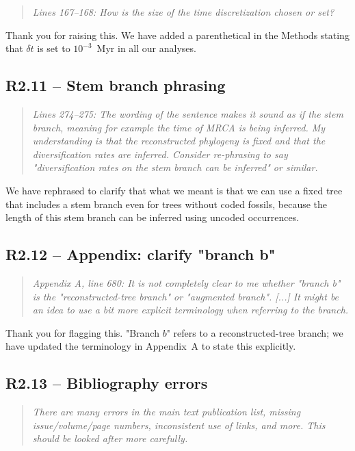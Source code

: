 \documentclass[11pt]{article}
\newenvironment{RC}{\begin{quote}\itshape}{\end{quote}}
\newcommand{\response}[1]{\noindent\textcolor{resp}{#1}\medskip}
\begin{document}
\begin{RC}
Lines 167--168: How is the size of the time discretization chosen or set?
\end{RC}

\response{Thank you for raising this. We have added a parenthetical in the Methods stating that $\delta t$ is set to $10^{-3}$~Myr in all our analyses.}

\subsection*{R2.11 -- Stem branch phrasing}

\begin{RC}
Lines 274--275: The wording of the sentence makes it sound as if the stem branch, meaning for example the time of MRCA is being inferred. My understanding is that the reconstructed phylogeny is fixed and that the diversification rates are inferred. Consider re-phrasing to say "diversification rates on the stem branch can be inferred" or similar.
\end{RC}

\response{We have rephrased to clarify that what we meant is that we can use a fixed tree that includes a stem branch even for trees without coded fossils, because the length of this stem branch can be inferred using uncoded occurrences.}

\subsection*{R2.12 -- Appendix: clarify "branch b"}

\begin{RC}
Appendix A, line 680: It is not completely clear to me whether "branch b" is the "reconstructed-tree branch" or "augmented branch". [...] It might be an idea to use a bit more explicit terminology when referring to the branch.
\end{RC}

\response{Thank you for flagging this. "Branch $b$" refers to a reconstructed-tree branch; we have updated the terminology in Appendix~A to state this explicitly.}

\subsection*{R2.13 -- Bibliography errors}

\begin{RC}
There are many errors in the main text publication list, missing issue/volume/page numbers, inconsistent use of links, and more. This should be looked after more carefully.
\end{RC}
\end{document}
